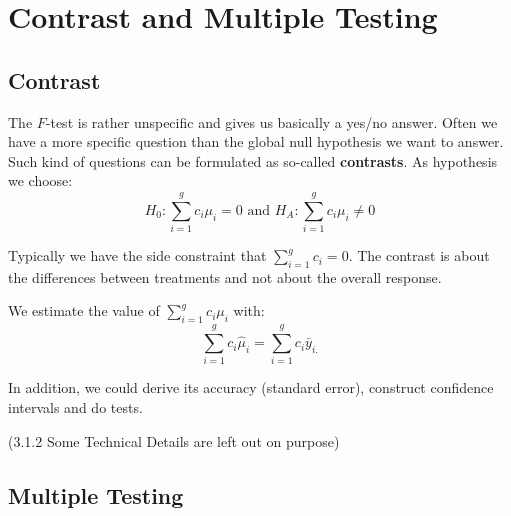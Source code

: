 \section{Contrast and Multiple Testing}

\subsection{Contrast}

The $F$-test is rather unspecific and gives us basically a yes/no answer. Often we have a more specific question than the global null hypothesis we want to answer. Such kind of questions can be formulated as so-called \textbf{contrasts}. As hypothesis we choose:
$$H_0 : \sum_{i=1}^g c_i \mu_i = 0 \text{ and } H_A : \sum_{i=1}^g c_i \mu_i \neq 0$$

Typically we have the side constraint that $\sum_{i=1}^g c_i = 0$. The contrast is about the differences between treatments and not about the overall response.

We estimate the value of $\sum_{i=1}^g c_i \mu_i$ with:
$$\sum_{i=1}^g c_i \hat \mu_i = \sum_{i=1}^g c_i \bar y_{i.}$$

In addition, we could derive its accuracy (standard error), construct confidence intervals and do tests. \medskip

(3.1.2 Some Technical Details are left out on purpose)

\subsection{Multiple Testing}


